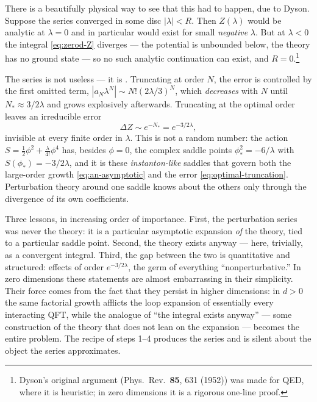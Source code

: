 \begin{eexample}
There is a beautifully physical way to see that this had to happen, due to
Dyson. Suppose the series converged in some disc $|\lambda| < R$. Then
$Z(\lambda)$ would be analytic at $\lambda = 0$ and in particular would exist
for small \emph{negative} $\lambda$. But at $\lambda < 0$ the integral
\eqref{eq:zerod-Z} diverges --- the potential is unbounded below, the theory has
no ground state --- so no such analytic continuation can exist, and $R =
0$.\footnote{Dyson's original argument (Phys.\ Rev.\ \textbf{85}, 631 (1952))
was made for QED, where it is heuristic; in zero dimensions it is a rigorous
one-line proof.}

The series is not useless --- it is . Truncating at order $N$,
the error is controlled by the first omitted term, $|a_N \lambda^N| \sim
N!(2\lambda/3)^N$, which \emph{decreases} with $N$ until $N_\ast \approx
3/2\lambda$ and grows explosively afterwards. Truncating at the optimal order
leaves an irreducible error
\begin{equation}
\Delta Z \sim e^{-N_\ast} = e^{-3/2\lambda} ,
\label{eq:optimal-truncation}
\end{equation}
invisible at every finite order in $\lambda$. This is not a random number: the
action $S = \frac{1}{2}\phi^2 + \frac{\lambda}{4!}\phi^4$ has, besides $\phi =
0$, the complex saddle points $\phi_\ast^2 = -6/\lambda$ with $S(\phi_\ast) =
-3/2\lambda$, and it is these \emph{instanton-like} saddles that govern both the
large-order growth \eqref{eq:an-asymptotic} and the error
\eqref{eq:optimal-truncation}. Perturbation theory around one saddle knows about
the others only through the divergence of its own coefficients.
\end{eexample}

Three lessons, in increasing order of importance. First, the perturbation series
was never the theory: it is a particular asymptotic expansion \emph{of} the
theory, tied to a particular saddle point. Second, the theory exists anyway ---
here, trivially, as a convergent integral. Third, the gap between the two is
quantitative and structured: effects of order $e^{-3/2\lambda}$, the germ of
everything ``nonperturbative.'' In zero dimensions these statements are almost
embarrassing in their simplicity. Their force comes from the fact that they
persist in higher dimensions:
in $d > 0$ the same factorial growth afflicts the loop expansion of essentially
every interacting QFT, while the analogue of ``the integral exists anyway'' ---
some construction of the theory that does not lean on the expansion --- becomes
the entire problem. The recipe of steps 1--4 produces the series and is silent
about the object the series approximates.

